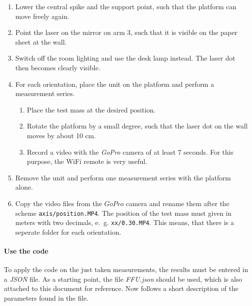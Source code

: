 \documentclass[journal]{IEEEtran}
\begin{document}
\begin{enumerate}
	\item Lower the central spike and the support point, such that the platform can move freely again.
	\item Point the laser on the mirror on arm 3, such that it is visible on the paper sheet at the wall.
	\item Switch off the room lighting and use the desk lamp instead. The laser dot then becomes clearly visible.
	\item For each orientation, place the unit on the platform and perform a measurement series.
		\begin{enumerate}
			\item Place the test mass at the desired position.
			\item Rotate the platform by a small degree, such that the laser dot on the wall moves by about 10 cm.
			\item Record a video with the \emph{GoPro} camera of at least 7 seconds. For this purpose, the WiFi remote is very useful.
		\end{enumerate}
	\item Remove the unit and perform one measurement series with the platform alone.
	\item Copy the video files from the $GoPro$ camera and rename them after the scheme \texttt{axis/position.MP4}. The position of the test mass must given in meters with two decimals, e.~g. \texttt{xx/0.30.MP4}. This means, that there is a seperate folder for each orientation.
\end{enumerate}

\paragraph{Use the code}

To apply the code on the just taken measurements, the results must be entered in a \emph{JSON} file. As a starting point, the file \emph{FFU.json} should be used, which is also attached to this document for reference.
Now follows a short description of the parameters found in the file.
\end{document}
